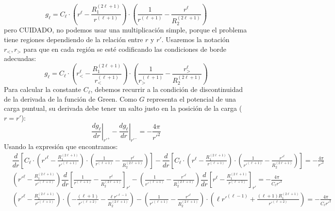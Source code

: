 \documentclass[]{article}
\numberwithin{equation}{section}
\newcommand{\0}{\textcolor{gray}{0}}
\newcommand{\td}[2]{\dfrac{d #1}{d #2}}
\begin{document}
\begin{enumerate}
	\begin{equation*}
		g_\ell = C_\ell \cdot \left(r^{\ell} - \frac{R_1^{(2\ell + 1)}}{r^{(\ell + 1)}}\right) \cdot \left(\frac{1}{r^{(\ell + 1)}} - \frac{r^{\ell}}{R_2^{(2\ell + 1)}}\right) 
	\end{equation*}
	pero CUIDADO, no podemos usar una multiplicación simple, porque el problema tiene regiones dependiendo de la relación entre \(r\) y \(r'\). Usaremos la notación \(r_<, r_>\) para que en cada región se esté codificando las condiciones de borde adecuadas:
	\begin{equation*}
		g_\ell = C_\ell \cdot \left(r_<^{\ell} - \frac{R_1^{(2\ell + 1)}}{r_<^{(\ell + 1)}}\right) \cdot \left(\frac{1}{r_>^{(\ell + 1)}} - \frac{r_>^{\ell}}{R_2^{(2\ell + 1)}}\right) 
	\end{equation*}
	Para calcular la constante $C_\ell$, debemos recurrir a la condición de discontinuidad de la derivada de la función de Green. Como $G$ representa el potencial de una carga puntual, su derivada debe tener un salto justo en la posición de la carga ($r=r'$):
	\begin{equation*}
		\left.\td{g_\ell}{r}\right|_{r'^+} - \left.\td{g_\ell}{r}\right|_{r'^-} = - \frac{4\pi}{r'^2}
	\end{equation*}
	Usando la expresión que encontramos:
	\begin{align*}
		&\td{}{r}\left[C_\ell \cdot \left(r'^{\ell} - \frac{R_1^{(2\ell + 1)}}{r'^{(\ell + 1)}}\right) \cdot \left(\frac{1}{r^{(\ell + 1)}} - \frac{r^{\ell}}{R_2^{(2\ell + 1)}}\right) \right] - \td{}{r}\left[C_\ell \cdot \left(r^{\ell} - \frac{R_1^{(2\ell + 1)}}{r^{(\ell + 1)}}\right) \cdot \left(\frac{1}{r'^{(\ell + 1)}} - \frac{r'^{\ell}}{R_2^{(2\ell + 1)}}\right) \right] = 	- \frac{4\pi}{r'^2}\\
		&\left(r'^{\ell} - \frac{R_1^{(2\ell + 1)}}{r'^{(\ell + 1)}}\right)\td{}{r}\left[\frac{1}{r^{(\ell + 1)}} - \frac{r^{\ell}}{R_2^{(2\ell + 1)}} \right]_{r'} - \left(\frac{1}{r'^{(\ell + 1)}} - \frac{r'^{\ell}}{R_2^{(2\ell + 1)}}\right) \td{}{r}\left[r^{\ell} - \frac{R_1^{(2\ell + 1)}}{r^{(\ell + 1)}} \right]_{r'} = 	- \frac{4\pi}{C_\ell r'^2}\\
		&\left(r'^{\ell} - \frac{R_1^{(2\ell + 1)}}{r'^{(\ell + 1)}}\right) \cdot \left(- \frac{(\ell + 1)}{r'^{(\ell + 2)}} - \frac{\ell r'^{\ell - 1}}{R_2^{(2\ell + 1)}} \right) - \left(\frac{1}{r'^{(\ell + 1)}} - \frac{r'^{\ell}}{R_2^{(2\ell + 1)}}\right) \cdot\left(\ell r'^{(\ell - 1)} + \frac{(\ell + 1) R_1^{(2\ell + 1)}}{r'^{(\ell + 2)}} \right) = - \frac{4\pi}{C_\ell r'^2}\\

\end{align*}
\end{enumerate}
\end{document}

